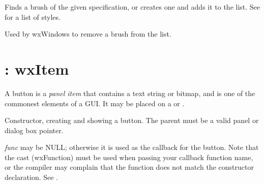 


Finds a brush of the given specification, or creates one and adds it to the list.
See  for a list of styles.



Used by wxWindows to remove a brush from the list.

\section{: wxItem}\label{wxbutton}

A button is a {\it panel item} that contains a text string or bitmap,
and is one of the commonest elements of a GUI. It may be placed on a
\rtfsp{} or .

\label{constrbutton}



Constructor, creating and showing a button. The parent must be a valid
panel or dialog box pointer.

{\it func} may be NULL; otherwise it is used as the callback for the
button.  Note that the cast (wxFunction) must be used when passing your
callback function name, or the compiler may complain that the function
does not match the constructor declaration. See .

